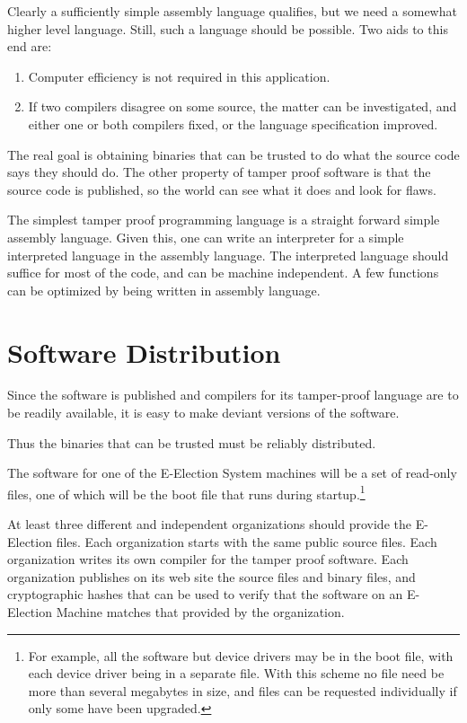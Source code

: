 \documentclass[12pt]{article}
\begin{document}
Clearly a sufficiently simple assembly language qualifies, but
we need a somewhat higher level language.  Still, such a language
should be possible.  Two aids to this end are:
\begin{enumerate}
\item
Computer efficiency is not required in this application.

\item
If two compilers disagree on some source, the matter can be
investigated, and either one or both compilers fixed, or the
language specification improved.
\end{enumerate}

The real goal is obtaining binaries that can be trusted to
do what the source code says they should do.  The other
property of tamper proof software is that the source code
is published, so the world can see what it does and look
for flaws.

The simplest tamper proof programming language is a straight
forward simple assembly language.  Given this, one can write
an interpreter for a simple interpreted language in the
assembly language.  The interpreted language should suffice
for most of the code, and can be machine independent.
A few functions can be optimized by being written in assembly
language.

\section{Software Distribution}\label{SOFTWARE-DISTRIBUTION}

Since the software is published and compilers for its tamper-proof
language are to be readily available, it is easy to make deviant
versions of the software.\label{DEVIANT-SOFTWARE}

Thus the binaries that can be trusted must be reliably distributed.

The software for one of the E-Election
System machines will be a set of read-only files, one of which will be
the boot file that runs during startup.\footnote{For example, all
the software but device drivers may be in the boot file, with each
device driver being in a separate file.  With this scheme no file
need be more than several megabytes in size, and files can be
requested individually if only some have been upgraded.}

At least three different and independent organizations should provide
the E-Election files.  Each organization starts with the same public
source files.  Each organization writes its own compiler for the
tamper proof software.  Each organization publishes on its web site
the source files and binary files, and cryptographic hashes that
can be used to verify that the software on an E-Election Machine
matches that provided by the organization.
\end{document}
